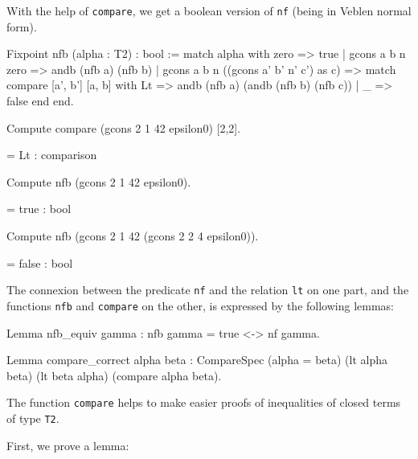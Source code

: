 {With the help of \texttt{compare}, we get a boolean version of \texttt{nf}
(being in Veblen normal form).

\begin{Coqsrc}
Fixpoint nfb (alpha : T2) : bool :=
  match alpha with
    zero => true
  | gcons a b n zero => andb (nfb a) (nfb b)
  | gcons a b n ((gcons a' b' n' c') as c) =>
    match compare [a', b'] [a, b] with
           Lt => andb (nfb a) (andb (nfb b) (nfb c))
           | _ => false
           end
end.
\end{Coqsrc}


\begin{Coqsrc}
Compute compare (gcons 2 1 42 epsilon0) [2,2].
\end{Coqsrc}

\begin{Coqanswer}
   = Lt
     : comparison
\end{Coqanswer}

\begin{Coqsrc}
Compute nfb  (gcons 2 1 42 epsilon0).
\end{Coqsrc}

\begin{Coqanswer}
   = true
     : bool
\end{Coqanswer}

\begin{Coqsrc}
Compute nfb (gcons 2 1 42 (gcons 2 2 4 epsilon0)).
\end{Coqsrc}

\begin{Coqanswer}
   = false
     : bool
\end{Coqanswer}

\begin{remark}
The connexion between the predicate \texttt{nf} and the relation \texttt{lt} on one part, and the functions \texttt{nfb} and \texttt{compare} on the other, is expressed by the following lemmas:

\begin{Coqsrc}
Lemma nfb_equiv gamma : nfb gamma = true <-> nf gamma.

Lemma compare_correct alpha beta :
  CompareSpec (alpha = beta) (lt alpha beta) (lt beta alpha)
              (compare alpha beta).
\end{Coqsrc}

The function \texttt{compare} helps to make easier proofs of inequalities of
closed terms of type \texttt{T2}.

First, we prove a lemma:


\end{remark}}
